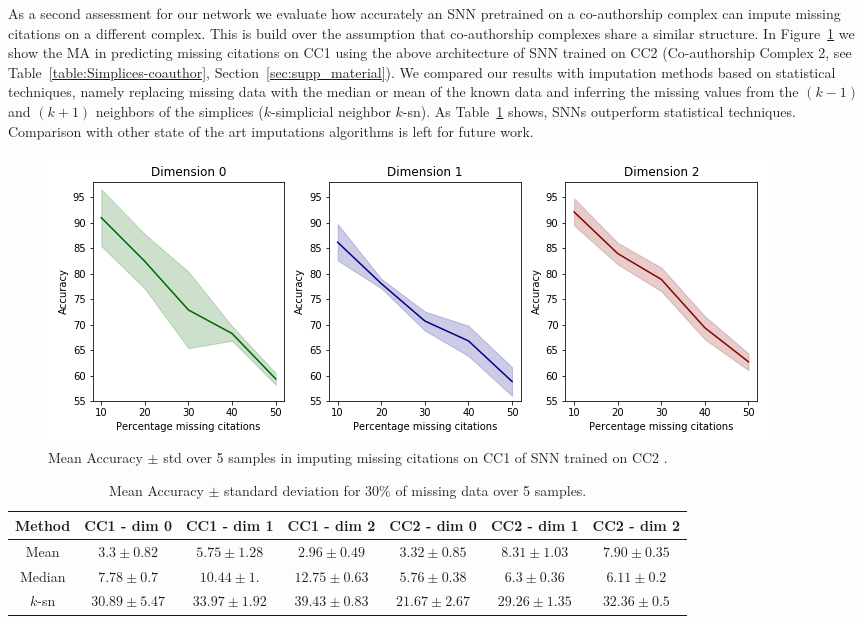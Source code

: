 As a second assessment for our network we evaluate how accurately an SNN pretrained on a co-authorship complex can impute missing citations on a different complex. This is build over the assumption that co-authorship complexes share a similar structure. In Figure~\ref{fig:transfer-learning} we show the MA in predicting missing citations on CC1 using the above architecture of SNN trained on CC2 (Co-authorship Complex 2, see Table~\ref{table:Simplices-coauthor}, Section~\ref{sec:supp_material}).
We compared our results with imputation methods based on statistical techniques, namely replacing missing data with the median or mean of the known data and inferring the missing values from the $(k-1)$ and $(k+1)$ neighbors of the simplices ($k$-simplicial neighbor $k$-sn). As Table~\ref{table:comparison-SNN} shows, SNNs outperform statistical techniques. Comparison with other state of the art imputations algorithms is left for future work.
\begin{figure}[htbp]
  \centering
\includegraphics[scale=0.35]{./figures/accuracy_network1_pretrained.png}
  \caption{ Mean Accuracy $\pm$ std over 5 samples in imputing missing citations on CC1 of SNN trained on CC2 . } \label{fig:transfer-learning}
\end{figure}

\begin{table}[htbp]
  \centering
  \scriptsize{
  \begin{tabular}{c|cccccc}
    \cmidrule(r){1-7}
    Method   & CC1 - dim 0   & CC1 - dim 1   & CC1 - dim 2   & CC2 - dim 0  & CC2 - dim 1  & CC2 - dim 2 \\
    \midrule
    Mean & $3.3 \pm 0.82$ & $5.75\pm 1.28$  &$ 2.96\pm 0.49$  & $3.32 \pm 0.85$ & $8.31 \pm 1.03$  & $7.90\pm 0.35$\\
    Median & $7.78 \pm 0.7$   & $10.44 \pm 1.$ &$ 12.75 \pm 0.63 $ & $5.76 \pm 0.38 $&$ 6.3\pm 0.36  $&$ 6.11\pm 0.2$\\
    $k$-sn & $30.89\pm 5.47 $& $33.97 \pm 1.92$ & $39.43 \pm 0.83  $& $21.67 \pm 2.67 $&$ 29.26\pm 1.35$   &$ 32.36 \pm 0.5 $\\
    \bottomrule
  \end{tabular}}
   \vspace{2pt}
  \caption{%
 Mean Accuracy $\pm$ standard deviation for $30\%$ of missing data over 5 samples. 
  }\label{table:comparison-SNN}
\end{table}%
